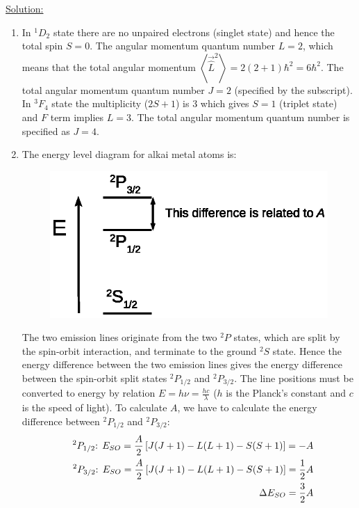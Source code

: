 \noindent
\underline{Solution:}\\

\begin{enumerate}
\item In $^1D_2$ state there are no unpaired electrons (singlet state) and hence the total spin $S = 0$. The angular momentum quantum number $L = 2$, which means that the total angular momentum $\left<\vec{\hat{L}}^2\right> = 2(2 + 1)\hbar^2 = 6\hbar^2$. The total angular momentum quantum number $J = 2$ (specified by the subscript). In $^3F_4$ state the multiplicity ($2S+1$) is 3 which gives $S = 1$ (triplet state) and $F$ term implies $L = 3$. The total angular momentum quantum number is specified as $J = 4$.
\item The energy level diagram for alkai metal atoms is:

\begin{figure}[htp!]
\centering\includegraphics[scale=0.7]{diagram}
\end{figure}

The two emission lines originate from the two $^2P$ states, which are split by the spin-orbit interaction, and terminate to the ground $^2S$ state.
Hence the energy difference between the two emission lines gives the energy difference between the spin-orbit split states $^2P_{1/2}$ and $^2P_{3/2}$.
The line positions must be converted to energy by relation $E = h\nu = \frac{hc}{\lambda}$ ($h$ is the Planck's constant and $c$ is the speed of light).
To calculate $A$, we have to calculate the energy difference between $^2P_{1/2}$ and $^2P_{3/2}$:
\begin{eqnarray}
\nonumber
& & ^2P_{1/2}\textnormal{: }E_{SO} = \frac{A}{2}\left[J(J+1) - L(L+1) - S(S+1)\right] = -A\\
\nonumber
& & ^2P_{3/2}\textnormal{: }E_{SO} = \frac{A}{2}\left[J(J+1) - L(L+1) - S(S+1)\right] = \frac{1}{2}A\\
\nonumber
& & \Delta E_{SO} = \frac{3}{2}A
\end{eqnarray}


\end{enumerate}
